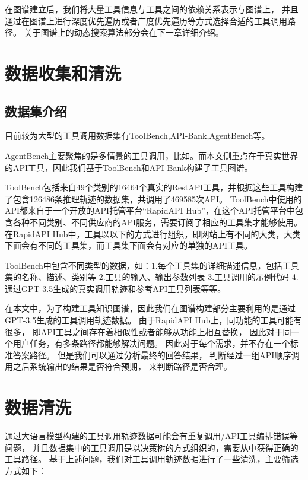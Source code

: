 在图谱建立后，我们将大量工具信息与工具之间的依赖关系表示与图谱上，
并且通过在图谱上进行深度优先遍历或者广度优先遍历等方式选择合适的工具调用路径。
关于图谱上的动态搜索算法部分会在下一章详细介绍。

\section{数据收集和清洗}

\subsection{数据集介绍}

目前较为大型的工具调用数据集有ToolBench\cite{Qin2023},API-Bank\cite{Li2023c},AgentBench\cite{Liu2023b}等。

AgentBench主要聚焦的是多情景的工具调用，比如。而本文侧重点在于真实世界的API工具，因此我们基于ToolBench和API-Bank构建了工具图谱。

ToolBench包括来自49个类别的16464个真实的RestAPI工具，并根据这些工具构建了包含126486条推理轨迹的数据集，共调用了469585次API。
ToolBench中使用的API都来自于一个开放的API托管平台“RapidAPI Hub”，在这个API托管平台中包含各种不同类别、不同供应商的API服务，需要订阅了相应的工具集才能够使用。在RapidAPI Hub中，工具以以下的方式进行组织，即网站上有不同的大类，大类下面会有不同的工具集，而工具集下面会有对应的单独的API工具。

ToolBench中包含不同类型的数据，如：1.每个工具集的详细描述信息，包括工具集的名称、描述、类别等 2.工具的输入、输出参数列表 3.工具调用的示例代码 4.通过GPT-3.5生成的真实调用轨迹和参考API工具列表等等。

在本文中，为了构建工具知识图谱，因此我们在图谱构建部分主要利用的是通过GPT-3.5生成的工具调用轨迹数据。
由于RapidAPI Hub上，同功能的工具可能有很多，
即API工具之间存在着相似性或者能够从功能上相互替换，
因此对于同一个用户任务，有多条路径都能够解决问题。
因此对于每个需求，并不存在一个标准答案路径。
但是我们可以通过分析最终的回答结果，
判断经过一组API顺序调用之后系统输出的结果是否符合预期，
来判断路径是否合理。

\section{数据清洗}

通过大语言模型构建的工具调用轨迹数据可能会有重复调用/API工具编排错误等问题，
并且数据集中的工具调用是以决策树的方式组织的，需要从中获得正确的工具路径。
基于上述问题，我们对工具调用轨迹数据进行了一些清洗，主要筛选方式如下：

